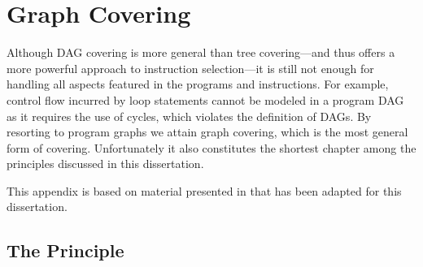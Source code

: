 %

\chapter{Graph Covering}


Although \gls{DAG covering} is more general than \gls{tree covering}---and thus
offers a more powerful approach to \gls{instruction selection}---it is still
not enough for handling all aspects featured in the \glspl{program} and
\glspl{instruction}.
%
For example, control flow incurred by loop statements
cannot be modeled in a \gls{program DAG} as it requires the use of
\glspl{cycle}, which violates the definition of \glspl{DAG}.
%
By resorting to
\glspl{program graph} we attain \gls{graph covering}, which is the most general
form of covering.
%
Unfortunately it also constitutes the shortest chapter among
the \glspl{principle} discussed in this dissertation.

This appendix is based on material presented in
\cite[Chap.]{HjortBlindell:2016:Survey} that has been adapted for
this dissertation.


\section{The Principle}


